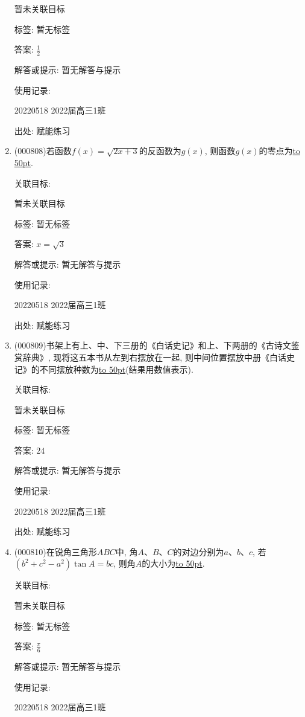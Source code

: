 \documentclass[10pt,a4paper]{article}
\newcommand{\blank}[1]{\underline{\hbox to #1pt{}}}
\begin{document}
\begin{enumerate}[1.]
暂未关联目标



标签: 暂无标签

答案: $\frac 12$

解答或提示: 暂无解答与提示

使用记录:

20220518	2022届高三1班	


出处: 赋能练习
\item { (000808)}若函数$f(x)=\sqrt{2x+3}$的反函数为$g(x)$, 则函数$g(x)$的零点为\blank{50}.


关联目标:

暂未关联目标



标签: 暂无标签

答案: $x=\sqrt 3$

解答或提示: 暂无解答与提示

使用记录:

20220518	2022届高三1班	


出处: 赋能练习
\item { (000809)}书架上有上、中、下三册的《白话史记》和上、下两册的《古诗文鉴赏辞典》, 现将这五本书从左到右摆放在一起, 则中间位置摆放中册《白话史记》的不同摆放种数为\blank{50}(结果用数值表示).


关联目标:

暂未关联目标



标签: 暂无标签

答案: $24$

解答或提示: 暂无解答与提示

使用记录:

20220518	2022届高三1班	


出处: 赋能练习
\item { (000810)}在锐角三角形$ABC$中, 角$A$、$B$、$C$的对边分别为$a$、$b$、$c$, 若$(b^2+c^2-a^2)\tan A=bc$, 则角$A$的大小为\blank{50}.


关联目标:

暂未关联目标



标签: 暂无标签

答案: $\frac{\pi }6$

解答或提示: 暂无解答与提示

使用记录:

20220518	2022届高三1班	



\end{enumerate}
\end{document}

